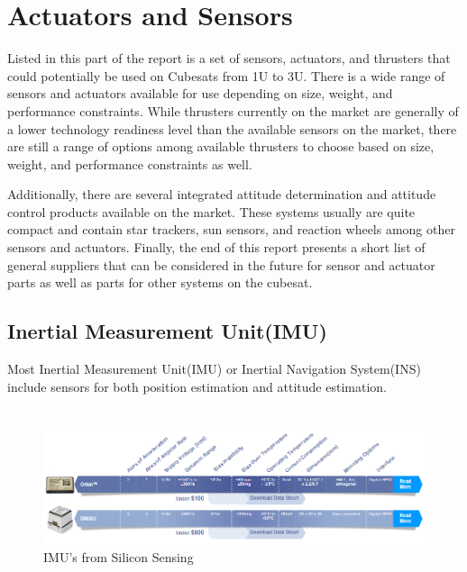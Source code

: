 %
%
%
%
%

\section{Actuators and Sensors}
Listed in this part of the report is a set of sensors, actuators, and thrusters that could potentially be used on Cubesats from 1U to 3U. There is a wide range of sensors and actuators available for use depending on size, weight, and performance constraints. While thrusters currently on the market are generally of a lower technology readiness level than the available sensors on the market, there are still a range of options among available thrusters to choose based on size, weight, and performance constraints as well. 

Additionally, there are several integrated attitude determination and attitude control products available on the market. These systems usually are quite compact and contain star trackers, sun sensors, and reaction wheels among other sensors and actuators. Finally, the end of this report presents a short list of general suppliers that can be considered in the future for sensor and actuator parts as well as parts for other systems on the cubesat. 

\subsection{Inertial Measurement Unit(IMU)}

Most Inertial Measurement Unit(IMU) or Inertial Navigation System(INS) include sensors for both position estimation and attitude estimation. \\\\


\begin{figure}[h!]
   \includegraphics[scale=0.6]{IMU/siliconSensing_IMU.PNG}
   \caption{IMU's from Silicon Sensing \cite{imu1}}
\end{figure}


